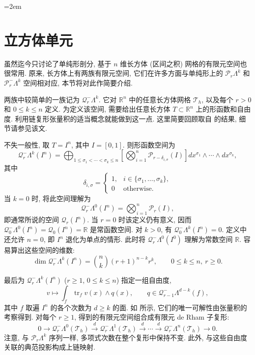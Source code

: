 \begingroup\emergencystretch=2em
\section{{立方体单元}}\label{sec:cubical-elements}

{虽然迄今只讨论了单纯形剖分, 基于 $n$ 维长方体 (区间之积) 网格的有限元空间也很常用. 原来, 长方体上有两族有限元空间, 它们在许多方面与单纯形上的 $\mathcal P_r\Lambda^k$ 和 $\mathcal P_r^-\Lambda^k$ 空间相对应, 本节将对此作简要介绍.}

{两族中较简单的一族记为 $\mathcal Q_r^-\Lambda^k$. 它对 $\mathbb R^n$ 中的任意长方体网格 $\mathcal T_h$, 以及每个 $r>0$ 和 $0\leq k\leq n$ 定义. 为定义该空间, 需要给出任意长方体 $T\subset\mathbb R^n$ 上的形函数和自由度. 利用链复形张量积的适当概念就能做到这一点. 这里简要回顾取自  的结果, 细节请参见该文.}

{不失一般性, 取 $T=I^n$, 其中 $I=[0,1]$. 则形函数空间为}
\[
\mathcal Q_r^-\Lambda^k(I^n)=\bigoplus_{1\leq\sigma_1<\cdots<\sigma_k\leq n}\left[\bigotimes_{i=1}^n\mathcal P_{r-\delta_{i,\sigma}}(I)\right]dx^{\sigma_1}\wedge\cdots\wedge dx^{\sigma_k},
\]
{其中}
\[
\delta_{i,\sigma}=\begin{cases}1,&i\in\{\sigma_1,\ldots,\sigma_k\},\\0&\text{otherwise}.\end{cases}
\]
{当 $k=0$ 时, 将此空间理解为}
\[
\mathcal Q_r^-\Lambda^0(I^n)=\bigotimes_{i=1}^n\mathcal P_r(I),
\]
{即通常所说的空间 $\mathcal Q_r(I^n)$. 当 $r=0$ 时该定义仍有意义, 因而 $\mathcal Q_0^-\Lambda^0(I^n)=\mathcal Q_0(I^n)=\mathbb R$ 是常函数空间. 对 $k>0$, 有 $\mathcal Q_0^-\Lambda^k(I^n)=0$. 定义中还允许 $n=0$, 即 $I^n$ 退化为单点的情形. 此时将 $\mathcal Q_r^-\Lambda^0(I^0)$ 理解为常数空间 $\mathbb R$. 容易算出这些空间的维数:}
\[
\dim\mathcal Q_r^-\Lambda^k(I^n)=\binom nk(r+1)^{n-k}r^k,\qquad0\leq k\leq n,\ r\geq0.
\]

{最后为 $\mathcal Q_r^-\Lambda^k(I^n)$ ($r\geq1$, $0\leq k\leq n$) 指定一组自由度,}
\begin{equation}\label{eq:tensor-product-form-dofs}
v\mapsto\int_f\operatorname{tr}_fv(x)\wedge q(x),\qquad q\in\mathcal Q_{r-1}^-\Lambda^{d-k}(f),
\end{equation}
{其中 $f$ 取遍 $I^n$ 的各个次数为 $d\geq k$ 的面. 如  所示, 它们的唯一可解性由张量积的考察得到. 对每个 $r\geq1$, 得到的有限元空间组合成有限元 de Rham 子复形:}
\[
0\to\mathcal Q_r^-\Lambda^0(\mathcal T_h)\xrightarrow{d}\mathcal Q_r^-\Lambda^1(\mathcal T_h)\xrightarrow{d}\cdots\xrightarrow{d}\mathcal Q_r^-\Lambda^n(\mathcal T_h)\to0.
\]
{注意, 与 $\mathcal P_r\Lambda^k$ 序列一样, 多项式次数在整个复形中保持不变. 此外, 与这些自由度关联的典范投影构成上链映射.}


